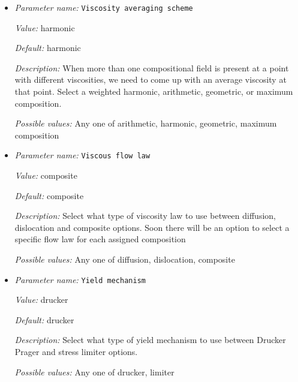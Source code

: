 \begin{itemize}
{\it Possible values:} A boolean value (true or false)
\item {\it Parameter name:} {\tt Viscosity averaging scheme}
\label{parameters:Material model/Visco Plastic/Viscosity averaging scheme}
\label{parameters:Material_20model/Visco_20Plastic/Viscosity_20averaging_20scheme}


{\it Value:} harmonic


{\it Default:} harmonic


{\it Description:} When more than one compositional field is present at a point with different viscosities, we need to come up with an average viscosity at that point.  Select a weighted harmonic, arithmetic, geometric, or maximum composition.


{\it Possible values:} Any one of arithmetic, harmonic, geometric, maximum composition
\item {\it Parameter name:} {\tt Viscous flow law}
\label{parameters:Material model/Visco Plastic/Viscous flow law}
\label{parameters:Material_20model/Visco_20Plastic/Viscous_20flow_20law}


{\it Value:} composite


{\it Default:} composite


{\it Description:} Select what type of viscosity law to use between diffusion, dislocation and composite options. Soon there will be an option to select a specific flow law for each assigned composition 


{\it Possible values:} Any one of diffusion, dislocation, composite
\item {\it Parameter name:} {\tt Yield mechanism}
\label{parameters:Material model/Visco Plastic/Yield mechanism}
\label{parameters:Material_20model/Visco_20Plastic/Yield_20mechanism}


{\it Value:} drucker


{\it Default:} drucker


{\it Description:} Select what type of yield mechanism to use between Drucker Prager and stress limiter options.


{\it Possible values:} Any one of drucker, limiter
\end{itemize}

